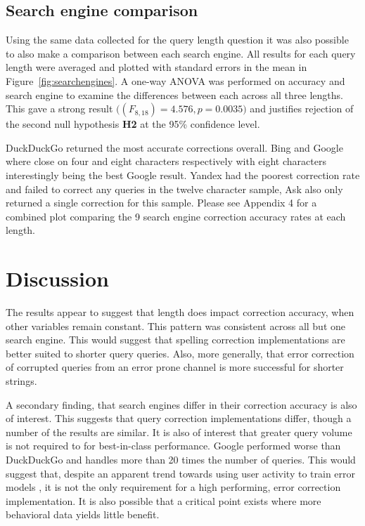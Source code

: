 \documentclass{csfourzero}
\begin{document}
\subsection{Search engine comparison}
Using the same data collected for the query length question it was also possible to also make a comparison between each search engine. All results for each query length were averaged and plotted with standard errors in the mean in Figure~\ref{fig:searchengines}. A one-way ANOVA was performed on accuracy and search engine to examine the differences between each across all three lengths. This gave a strong result $\big((F_{8,18}) = 4.576, p = 0.0035\big)$ and justifies rejection of the second null hypothesis \textbf{H2} at the 95\% confidence level.

DuckDuckGo returned the most accurate corrections overall. Bing and Google where close on four and eight characters respectively with eight characters interestingly being the best Google result. Yandex had the poorest correction rate and failed to correct any queries in the twelve character sample, Ask also only returned a single correction for this sample. Please see Appendix 4 for a combined plot comparing the 9 search engine correction accuracy rates at each length.

\section{Discussion}
\label{sec:discuss}

The results appear to suggest that length does impact correction accuracy, when other variables remain constant. This pattern was consistent across all but one search engine. This would suggest that spelling correction implementations are better suited to shorter query queries. Also, more generally, that error correction of corrupted queries from an error prone channel is more successful for shorter strings.

A secondary finding, that search engines differ in their correction accuracy is also of interest. This suggests that query correction implementations differ, though a number of the results are similar. It is also of interest that greater query volume is not required to for best-in-class performance. Google performed worse than DuckDuckGo and handles more than 20 times the number of queries. This would suggest that, despite an apparent trend towards using user activity to train error models \cite{webuserpoweredspelling, webuser3, webuser2learningerrormodel, webuser4google2009}, it is not the only requirement for a high performing, error correction implementation. It is also possible that a critical point exists where more behavioral data yields little benefit.
\end{document}
